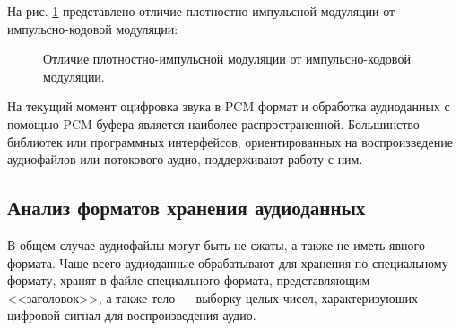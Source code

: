 		\par На рис. \ref{fig:DSMMod} представлено отличие плотностно-импульсной модуляции от импульсно-кодовой модуляции:
		\begin{figure}[!h]
			\caption{Отличие плотностно-импульсной модуляции от импульсно-кодовой модуляции.}
			\label{fig:DSMMod}
		\end{figure}

		\par На текущий момент оцифровка звука в PCM формат 
		и обработка аудиоданных с помощью PCM буфера является наиболее распространенной.
		Большинство библиотек или программных интерфейсов, 
		ориентированных на воспроизведение аудиофайлов или потокового аудио, поддерживают работу с ним.
		
\subsection{Анализ форматов хранения аудиоданных}

	\par В общем случае аудиофайлы могут быть не сжаты, а также не иметь явного формата.
	Чаще всего аудиоданные обрабатывают для хранения по специальному формату, хранят в файле специального формата,
	представляющим <<заголовок>>, а также тело --- выборку целых чисел, характеризующих цифровой сигнал для воспроизведения аудио.

